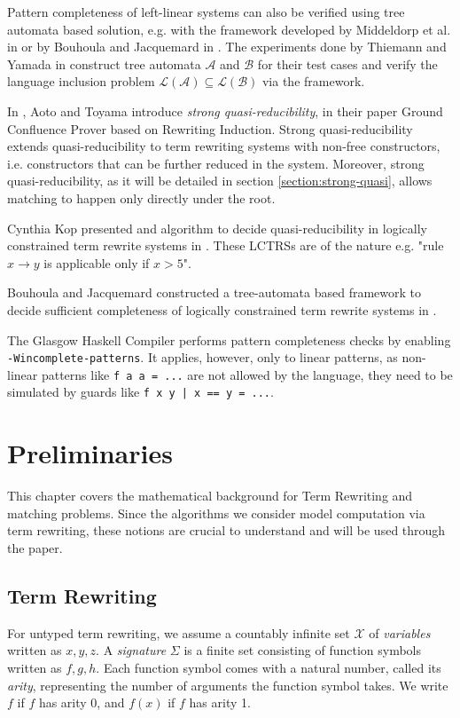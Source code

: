 \documentclass{report}
\theoremstyle{definition}
\begin{document}
Pattern completeness of left-linear systems can also be verified using tree automata based solution, e.g. with the framework developed by Middeldorp et al. in \cite{middeldorp} or by Bouhoula and Jacquemard in \cite{bouhoula}. The experiments done by Thiemann and Yamada in \cite{thiemann} construct tree automata $\mathcal{A}$ and $\mathcal{B}$ for their test cases and verify the language inclusion problem $\mathcal{L}(\mathcal{A}) \subseteq \mathcal{L}(\mathcal{B})$ via the framework.

In \cite{aoto}, Aoto and Toyama introduce \textit{strong quasi-reducibility}, in their paper Ground Confluence Prover based on Rewriting Induction. Strong quasi-reducibility extends quasi-reducibility to term rewriting systems with non-free constructors, i.e. constructors that can be further reduced in the system. Moreover, strong quasi-reducibility, as it will be detailed in section \ref{section:strong-quasi}, allows matching to happen only directly under the root.

Cynthia Kop presented and algorithm to decide quasi-reducibility in logically constrained term rewrite systems in \cite{cynthia}. These LCTRSs are of the nature e.g. "rule $x \rightarrow y$ is applicable only if $x > 5$".

Bouhoula and Jacquemard constructed a tree-automata based framework to decide sufficient completeness of logically constrained term rewrite systems in \cite{bouhoula}.

The Glasgow Haskell Compiler \cite{ghc} performs pattern completeness checks by enabling \texttt{-Wincomplete-patterns}. It applies, however, only to linear patterns, as non-linear patterns like \texttt{f a a = ...} are not allowed by the language, they need to be simulated by guards like \texttt{f x y | x == y = ...}.

\chapter{Preliminaries}\label{chapter:preliminaries}
This chapter covers the mathematical background for Term Rewriting and matching problems. Since the algorithms we consider model computation via term rewriting, these notions are crucial to understand and will be used through the paper.

\section{Term Rewriting}
For untyped term rewriting, we assume a countably infinite set $\mathcal{X}$ of \textit{variables} written as $x, y, z$. A \textit{signature} $\Sigma$ is a finite set consisting of function symbols written as  $f, g, h$. Each function symbol comes with a natural number, called its \textit{arity}, representing the number of arguments the function symbol takes. We write $f$ if $f$ has arity 0, and $f(x)$ if $f$ has arity 1.
\end{document}
